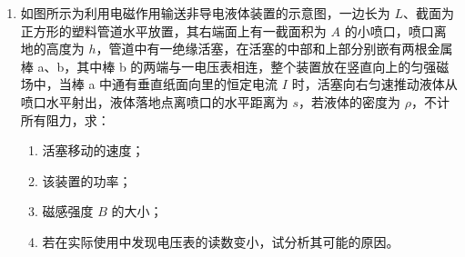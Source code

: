 \documentclass[\gkver]{gaokaozhenti}
\begin{document}
\begin{enumerate}
{$x=\frac{v_{0}^{2}}{2a}=\frac{2^{2}}{2\times2}\Um=1\Um$ ①

（2）金属直杆运动的速度最大时有最大电流

$I_{\max}=\frac{Blv_{0}}{R}$，$I'=\frac{1}{2}I_{\max}=\frac{Blv_{0}}{2R}$

金属直杆受到的安培力为

$F_{A}=BI'l=\frac{B^{2}l^{2}v_{0}}{2R}=\frac{0.5^{2}\times0.2^{2}\times2}{2\times0.5}\UN=0.02\UN$ ②

金属直杆向右运动时，由牛顿第二定律得

$F+F_{A}=ma$

解得 $F=ma-F_{A}=0.18\UN$，方向与 $x$ 轴正方向相反。 ③

金属直杆向左运动时，由牛顿第二定律得

$F-F_{A}=ma$

解得 $F=ma+F_{A}=0.22\UN$，方向与 $x$ 轴正方向相反。 ④

（3）开始时：$v=v_{0}$，$F_{A}=\frac{B^{2}l^{2}v_{0}}{R}$

由牛顿第二定律得

$F+F_{A}=ma$，解得 $F=ma-F_{A}=ma-\frac{B^{2}l^{2}v_{0}}{R}$ ⑤

当 $v_{0}<\frac{maR}{B^{2}l^{2}}=\frac{0.1\times2\times0.5}{0.5^{2}\times0.2^{2}}\Ums=10\Ums$ 时，$F>0$，方向与 $x$ 轴正方向相反，⑥

当 $v_{0}>\frac{maR}{B^{2}l^{2}}=10\Ums$ 时，$F<0$，方向与 $x$ 轴正方向相同。 ⑦
}

\item
如图所示为利用电磁作用输送非导电液体装置的示意图，一边长为 $L$、截面为正方形的塑料管道水平放置，其右端面上有一截面积为 $A$ 的小喷口，喷口离地的高度为 $h$，管道中有一绝缘活塞，在活塞的中部和上部分别嵌有两根金属棒 a、b，其中棒 b 的两端与一电压表相连，整个装置放在竖直向上的匀强磁场中，当棒 a 中通有垂直纸面向里的恒定电流 $I$ 时，活塞向右匀速推动液体从喷口水平射出，液体落地点离喷口的水平距离为 $s$，若液体的密度为 $\rho$，不计所有阻力，求：

\begin{enumerate}
\item
活塞移动的速度；
\item
该装置的功率；
\item
磁感强度 $B$ 的大小；
\item
若在实际使用中发现电压表的读数变小，试分析其可能的原因。
\end{enumerate}


\end{enumerate}
\end{document}
